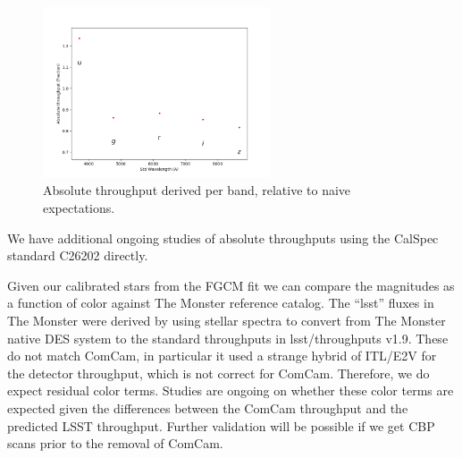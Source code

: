\begin{figure}
  \begin{center}
    \includegraphics[width=0.6\textwidth]{photometric_calibration_figures/abs_throughput.png}
  \end{center}
  \caption{Absolute throughput derived per band, relative to naive expectations.}
  \label{fig:absthroughputs}
\end{figure}

We have additional ongoing studies of absolute throughputs using the CalSpec
standard C26202 directly.


Given our calibrated stars from the FGCM fit we can compare the magnitudes as a
function of color against The Monster reference catalog.  The ``lsst'' fluxes
in The Monster were derived by using stellar spectra to convert from The
Monster native DES system to the standard throughputs in lsst/throughputs
v1.9. These do not match ComCam, in particular it used a strange hybrid of
ITL/E2V for the detector throughput, which is not correct for
ComCam. Therefore, we do expect residual color terms.  Studies are ongoing on
whether these color terms are expected given the differences between the ComCam
throughput and the predicted LSST throughput.  Further validation will be
possible if we get CBP scans prior to the removal of ComCam.

